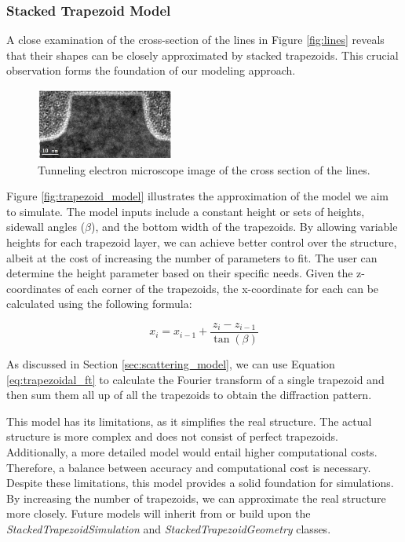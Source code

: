 \subsubsection{Stacked Trapezoid Model}

A close examination of the cross-section of the lines in Figure \ref{fig:lines} reveals that their shapes can be closely approximated by stacked trapezoids. This crucial observation forms the foundation of our modeling approach.

\medskip

\begin{figure}[h]
    \centering
    \includegraphics[width=0.4\textwidth]{images/trap_model.PNG}
    \caption{Tunneling electron microscope image of the cross section of the lines.\cite{phd_freychet}}
    \label{fig:trapezoid}
\end{figure}

Figure \ref{fig:trapezoid_model} illustrates the approximation of the model we aim to simulate. 
The model inputs include a constant height or sets of heights, sidewall angles ($\beta$), and the
 bottom width of the trapezoids. By allowing variable heights for each trapezoid layer, we can 
 achieve better control over the structure, albeit at the cost of increasing the number of 
 parameters to fit. The user can determine the height parameter based on their specific needs. 
 Given the z-coordinates of each corner of the trapezoids, the x-coordinate for each can be 
 calculated using the following formula:

\medskip

\begin{equation}
    x_{i} = x_{i-1} + \frac{z_{i} - z_{i-1}}{\tan(\beta)}
\end{equation}

\medskip

As discussed in Section \ref{sec:scattering_model}, we can use Equation \ref{eq:trapezoidal_ft} 
to calculate the Fourier transform of a single trapezoid and then sum them all up of 
all the trapezoids to obtain the diffraction pattern.

\medskip

This model has its limitations, as it simplifies the real structure. The actual structure is more 
complex and does not consist of perfect trapezoids. Additionally, a more detailed model would 
entail higher computational costs. Therefore, a balance between accuracy and computational cost 
is necessary. Despite these limitations, this model provides a solid foundation for simulations. 
By increasing the number of trapezoids, we can approximate the real structure more closely. Future
models will inherit from or build upon the \textit{StackedTrapezoidSimulation} and 
\textit{StackedTrapezoidGeometry} classes.

